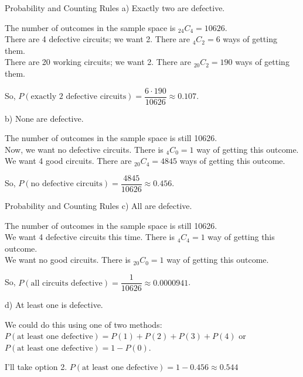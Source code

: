 \documentclass[t, aspectratio=169]{beamer}
\newcommand{\?}{\stackrel{?}{=}}
\begin{document}
	\begin{frame}{Probability and Counting Rules}
		a) Exactly two are defective. \pause
		
		The number of outcomes in the sample space is $_{24} C _4 = 10626$. \pause \\
		There are 4 defective circuits; we want 2. There are $_4 C _2 = 6$ ways of getting them. \pause \\
		There are 20 working circuits; we want 2. There are $_{20} C _2 = 190$ ways of getting them. \pause
		
		So, $P(\text{exactly 2 defective circuits}) = \dfrac{6 \cdot 190}{10626} \approx 0.107$. \pause
		
		b) None are defective. \pause
		
		The number of outcomes in the sample space is still 10626. \pause \\
		Now, we want no defective circuits. There is $_4 C _0 = 1$ way of getting this outcome. \pause \\
		We want 4 good circuits. There are $_{20} C _4 = 4845$ ways of getting this outcome. \pause
		
		So, $P(\text{no defective circuits}) = \dfrac{4845}{10626} \approx 0.456$.
	\end{frame}

	\begin{frame}{Probability and Counting Rules}
		c) All are defective. \pause
		
		The number of outcomes in the sample space is still 10626. \pause \\
		We want 4 defective circuits this time. There is $_4 C _4 = 1$ way of getting this outcome. \\ \pause
		We want no good circuits. There is $_{20} C _0 = 1$ way of getting this outcome. \pause
		
		So, $P(\text{all circuits defective}) = \dfrac{1}{10626} \approx 0.0000941$. \pause
		
		d) At least one is defective.
		
		We could do this using one of two methods: \pause \\
		$P(\text{at least one defective}) = P(1) + P(2) + P(3) + P(4)$ or \pause \\
		$P(\text{at least one defective}) = 1 - P(0)$. \pause
		
		I'll take option 2. $P(\text{at least one defective}) = 1 - 0.456 \approx 0.544$
	\end{frame}
\end{document}

